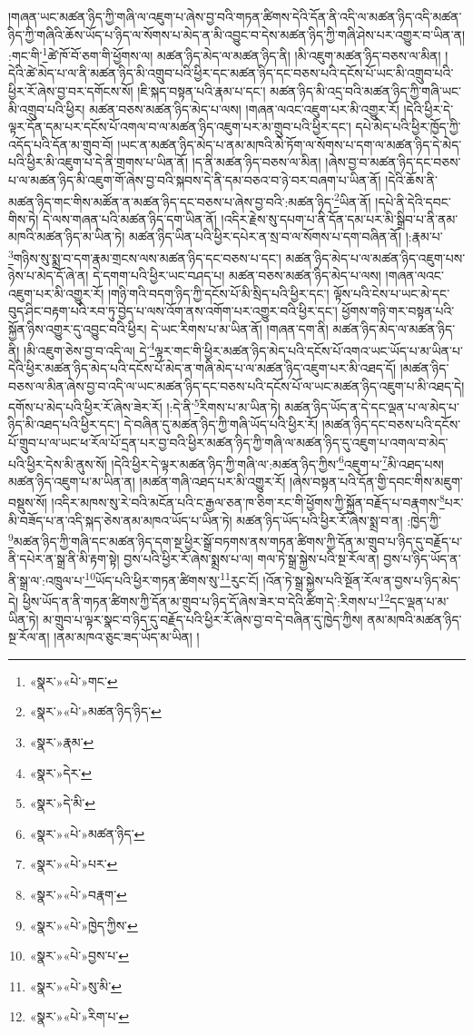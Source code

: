 །གཞན་ཡང་མཚན་ཉིད་ཀྱི་གཞི་ལ་འཇུག་པ་ཞེས་བྱ་བའི་གཏན་ཚིགས་དེའི་དོན་ནི་འདི་ལ་མཚན་ཉིད་འདི་མཚན་ཉིད་ཀྱི་གཞིའི་ཆོས་ཡོད་པ་ཉིད་ལ་སོགས་པ་མེད་ན་མི་འབྱུང་བ་དེས་མཚན་ཉིད་ཀྱི་གཞི་ཤེས་པར་འགྱུར་བ་ཡིན་ན། :གང་གི་\footnote{«སྣར་»«པེ་»གང་}ཚེ་ཁོ་བོ་ཅག་གི་ཕྱོགས་ལ། མཚན་ཉིད་མེད་ལ་མཚན་ཉིད་ནི། །མི་འཇུག་མཚན་ཉིད་བཅས་ལ་མིན། །དེའི་ཚེ་མེད་པ་ལ་ནི་མཚན་ཉིད་མི་འགྲུབ་པའི་ཕྱིར་དང་མཚན་ཉིད་དང་བཅས་པའི་དངོས་པོ་ཡང་མི་འགྲུབ་པའི་ཕྱིར་རོ་ཞེས་བྱ་བར་དགོངས་སོ། །ཇི་སྐད་བསྟན་པའི་རྣམ་པ་དང་། མཚན་ཉིད་མི་འདྲ་བའི་མཚན་ཉིད་ཀྱི་གཞི་ཡང་མི་འགྲུབ་པའི་ཕྱིར། མཚན་བཅས་མཚན་ཉིད་མེད་པ་ལས། །གཞན་ལའང་འཇུག་པར་མི་འགྱུར་རོ། །དེའི་ཕྱིར་དེ་ལྟར་དོན་དམ་པར་དངོས་པོ་འགལ་བ་ལ་མཚན་ཉིད་འཇུག་པར་མ་གྲུབ་པའི་ཕྱིར་དང་། དཔེ་མེད་པའི་ཕྱིར་ཁྱོད་ཀྱི་འདོད་པའི་དོན་མ་གྲུབ་བོ། །ཡང་ན་མཚན་ཉིད་མེད་པ་ནམ་མཁའི་མེ་ཏོག་ལ་སོགས་པ་དག་ལ་མཚན་ཉིད་དེ་མེད་པའི་ཕྱིར་མི་འཇུག་པ་དེ་ནི་གྲགས་པ་ཡིན་ནོ། །ད་ནི་མཚན་ཉིད་བཅས་ལ་མིན། །ཞེས་བྱ་བ་མཚན་ཉིད་དང་བཅས་པ་ལ་མཚན་ཉིད་མི་འཇུག་གོ་ཞེས་བྱ་བའི་སྐབས་དེ་ནི་དམ་བཅའ་བ་ཉེ་བར་བཞག་པ་ཡིན་ནོ། །དེའི་ཆོས་ནི་མཚན་ཉིད་གང་གིས་མཚོན་ན་མཚན་ཉིད་དང་བཅས་པ་ཞེས་བྱ་བའི་:མཚན་ཉིད་\footnote{«སྣར་»«པེ་»མཚན་ཉིད་ཉིད་}ཡིན་ནོ། །དཔེ་ནི་དེའི་དབང་གིས་ཏེ། དེ་ལས་གཞན་པའི་མཚན་ཉིད་དག་ཡིན་ནོ། །འདིར་རྗེས་སུ་དཔག་པ་ནི་དོན་དམ་པར་མི་སྒྲིབ་པ་ནི་ནམ་མཁའི་མཚན་ཉིད་མ་ཡིན་ཏེ། མཚན་ཉིད་ཡིན་པའི་ཕྱིར་དཔེར་ན་སྲ་བ་ལ་སོགས་པ་དག་བཞིན་ནོ། །:རྣམ་པ་\footnote{«སྣར་»རྣམ་}གཉིས་སུ་སྨྲ་བ་དག་རྣམ་གྲངས་ལས་མཚན་ཉིད་དང་བཅས་པ་དང་། མཚན་ཉིད་མེད་པ་ལ་མཚན་ཉིད་འཇུག་པས་ཉེས་པ་མེད་དོ་ཞེ་ན། དེ་དགག་པའི་ཕྱིར་ཡང་བཤད་པ། མཚན་བཅས་མཚན་ཉིད་མེད་པ་ལས། །གཞན་ལའང་འཇུག་པར་མི་འགྱུར་རོ། །གཉི་གའི་བདག་ཉིད་ཀྱི་དངོས་པོ་མི་སྲིད་པའི་ཕྱིར་དང་། ལྟོས་པའི་ངེས་པ་ཡང་མེ་དང་བུད་ཤིང་བརྟག་པའི་རབ་ཏུ་བྱེད་པ་ལས་འོག་ནས་འགོག་པར་འགྱུར་བའི་ཕྱིར་དང་། ཕྱོགས་གཉི་གར་བསྟན་པའི་སྐྱོན་ཉིས་འགྱུར་དུ་འབྱུང་བའི་ཕྱིར། དེ་ཡང་རིགས་པ་མ་ཡིན་ནོ། །གཞན་དག་ནི། མཚན་ཉིད་མེད་ལ་མཚན་ཉིད་ནི། །མི་འཇུག་ཅེས་བྱ་བ་འདི་ལ། དེ་\footnote{«སྣར་»དེར་}ལྟར་གང་གི་ཕྱིར་མཚན་ཉིད་མེད་པའི་དངོས་པོ་འགའ་ཡང་ཡོད་པ་མ་ཡིན་པ་དེའི་ཕྱིར་མཚན་ཉིད་མེད་པའི་དངོས་པོ་མེད་ན་གཞི་མེད་པ་ལ་མཚན་ཉིད་འཇུག་པར་མི་འཐད་དོ། །མཚན་ཉིད་བཅས་ལ་མིན་ཞེས་བྱ་བ་འདི་ལ་ཡང་མཚན་ཉིད་དང་བཅས་པའི་དངོས་པོ་ལ་ཡང་མཚན་ཉིད་འཇུག་པ་མི་འཐད་དེ། དགོས་པ་མེད་པའི་ཕྱིར་རོ་ཞེས་ཟེར་རོ། །:དེ་ནི་\footnote{«སྣར་»དེ་མི་}རིགས་པ་མ་ཡིན་ཏེ། མཚན་ཉིད་ཡོད་ན་དེ་དང་ལྡན་པ་ལ་མེད་པ་ཉིད་མི་འཐད་པའི་ཕྱིར་དང་། དེ་བཞིན་དུ་མཚན་ཉིད་ཀྱི་གཞི་ཡོད་པའི་ཕྱིར་རོ། །མཚན་ཉིད་དང་བཅས་པའི་དངོས་པོ་གྲུབ་པ་ལ་ཡང་ཕ་རོལ་པོ་དྲན་པར་བྱ་བའི་ཕྱིར་མཚན་ཉིད་ཀྱི་གཞི་ལ་མཚན་ཉིད་དུ་འཇུག་པ་འགལ་བ་མེད་པའི་ཕྱིར་དེས་མི་ནུས་སོ། །དེའི་ཕྱིར་དེ་ལྟར་མཚན་ཉིད་ཀྱི་གཞི་ལ་:མཚན་ཉིད་ཀྱིས་\footnote{«སྣར་»«པེ་»མཚན་ཉིད་}འཇུག་པ་\footnote{«སྣར་»«པེ་»པར་}མི་འཐད་པས། མཚན་ཉིད་འཇུག་པ་མ་ཡིན་ན། །མཚན་གཞི་འཐད་པར་མི་འགྱུར་རོ། །ཞེས་བསྟན་པའི་དོན་གྱི་དབང་གིས་མཇུག་བསྡུས་སོ། །འདིར་མཁས་སུ་རེ་བའི་མངོན་པའི་ང་རྒྱལ་ཅན་ཁ་ཅིག་རང་གི་ཕྱོགས་ཀྱི་སྐྱོན་བརྗོད་པ་བརྣགས་\footnote{«སྣར་»«པེ་»བརྣག་}པར་མི་བཟོད་པ་ན་འདི་སྐད་ཅེས་ནམ་མཁའ་ཡོད་པ་ཡིན་ཏེ། མཚན་ཉིད་ཡོད་པའི་ཕྱིར་རོ་ཞེས་སྨྲ་བ་ན། :ཁྱེད་ཀྱི་\footnote{«སྣར་»«པེ་»ཁྱེད་ཀྱིས་}མཚན་ཉིད་ཀྱི་གཞི་དང་མཚན་ཉིད་དག་སྔ་ཕྱིར་སྒྲོ་བཏགས་ནས་གཏན་ཚིགས་ཀྱི་དོན་མ་གྲུབ་པ་ཉིད་དུ་བརྗོད་པ་ནི་དཔེར་ན་སྒྲ་ནི་མི་རྟག་སྟེ། བྱས་པའི་ཕྱིར་རོ་ཞེས་སྨྲས་པ་ལ། གལ་ཏེ་སྒྲ་སྐྱེས་པའི་སྔ་རོལ་ན། བྱས་པ་ཉིད་ཡོད་ན་ནི་སྒྲ་ལ་:འཁྲུལ་པ་\footnote{«སྣར་»«པེ་»བྱས་པ་}ཡོད་པའི་ཕྱིར་གཏན་ཚིགས་སུ་\footnote{«སྣར་»«པེ་»སུ་མི་}རུང་ངོ། །འོན་ཏེ་སྒྲ་སྐྱེས་པའི་སྔོན་རོལ་ན་བྱས་པ་ཉིད་མེད་དེ། ཕྱིས་ཡོད་ན་ནི་གཏན་ཚིགས་ཀྱི་དོན་མ་གྲུབ་པ་ཉིད་དོ་ཞེས་ཟེར་བ་དེའི་ཚིག་དེ་:རིགས་པ་\footnote{«སྣར་»«པེ་»རིག་པ་}དང་ལྡན་པ་མ་ཡིན་ཏེ། མ་གྲུབ་པ་ལྟར་སྣང་བ་ཉིད་དུ་བརྗོད་པའི་ཕྱིར་རོ་ཞེས་བྱ་བ་དེ་བཞིན་དུ་ཁྱེད་ཀྱིས། ནམ་མཁའི་མཚན་ཉིད་སྔ་རོལ་ན། །ནམ་མཁའ་ཅུང་ཟད་ཡོད་མ་ཡིན། །
